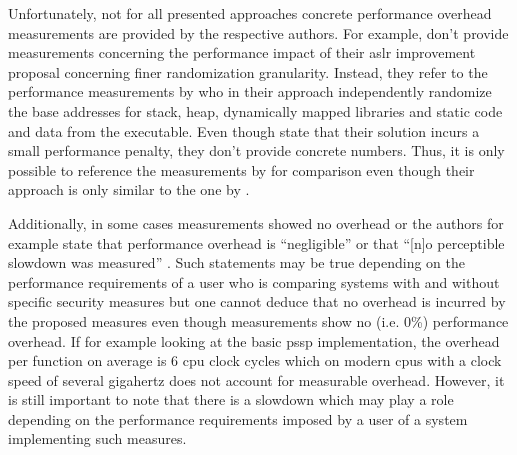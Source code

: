 Unfortunately, not for all presented approaches concrete performance overhead measurements are provided by the respective authors.
For example, \citeauthor{Shacham2004} don't provide measurements concerning the performance impact of their \gls{aslr} improvement proposal concerning finer randomization granularity.
Instead, they refer to the performance measurements by \citeauthor{Bhatkar2003} who in their approach independently randomize the base addresses for stack, heap, dynamically mapped libraries and static code and data from the executable.
Even though \citeauthor{Shacham2004} state that their solution incurs a small performance penalty, they don't provide concrete numbers.
Thus, it is only possible to reference the measurements by \citeauthor{Bhatkar2003} for comparison even though their approach is only similar to the one by \citeauthor{Shacham2004} \cites[117]{Bhatkar2003}[304\psq]{Shacham2004}.

Additionally, in some cases measurements showed no overhead or the authors for example state that performance overhead is ``negligible'' \cites[250]{MarcoGisbert2013}[252\psq]{Wang2018} or that ``[n]o perceptible slowdown was measured'' \cite{Shanbhogue2019}.
Such statements may be true depending on the performance requirements of a user who is comparing systems with and without specific security measures but one cannot deduce that no overhead is incurred by the proposed measures even though measurements show no (i.e. 0\%) performance overhead.
If for example looking at the basic \gls{pssp} implementation, the overhead per function on average is 6 \gls{cpu} clock cycles \cite[252]{Wang2018} which on modern \glspl{cpu} with a clock speed of several gigahertz does not account for measurable overhead.
However, it is still important to note that there is a slowdown which may play a role depending on the performance requirements imposed by a user of a system implementing such measures.
